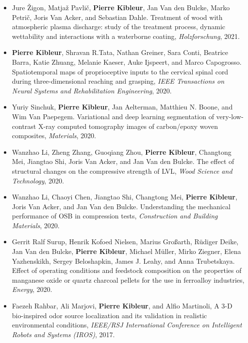 \documentclass[oneside, english, 10pt, a4paper]{memoir}
\begin{document}
\begin{itemize}[leftmargin=*]
		\item {Jure \v{Z}}igon, Matja{\v{z}} Pavli{\v{c}}, \textbf{Pierre Kibleur}, Jan Van den Bulcke, Marko Petri{\v{c}}, Joris Van Acker, and Sebastian Dahle. {Treatment of wood with atmospheric plasma discharge: study of the treatment process, dynamic wettability and interactions with a waterborne coating}, \emph{{Holzforschung}}, 2021.
		
		\item {\textbf{Pierre Kibleur}, Shravan R.Tata, Nathan Greiner, Sara Conti, Beatrice Barra, Katie Zhuang, Melanie Kaeser, Auke Ijspeert, and Marco Capogrosso}. {Spatiotemporal maps of proprioceptive inputs to the cervical spinal cord during three-dimensional reaching and grasping}, \emph{IEEE Transactions on Neural Systems and Rehabilitation Engineering}, 2020.
		
		\item {Yuriy Sinchuk, \textbf{Pierre Kibleur}, Jan Aelterman, Matthieu N. Boone, and Wim Van Paepegem}. {Variational and deep learning segmentation of very-low-contrast X-ray computed tomography images of carbon/epoxy woven composites}, \emph{Materials}, 2020.   
		
		\item {Wanzhao Li, Zheng Zhang, Guoqiang Zhou, \textbf{Pierre Kibleur}, Changtong Mei, Jiangtao Shi, Joris Van Acker, and Jan Van den Bulcke}. {The effect of structural changes on the compressive strength of LVL}, \emph{Wood Science and Technology}, 2020.     
		
		\item  {Wanzhao Li, Chaoyi Chen, Jiangtao Shi, Changtong Mei, \textbf{Pierre Kibleur}, Joris Van Acker, and Jan Van den Bulcke}. {Understanding the mechanical performance of OSB in compression tests}, \emph{Construction and Building Materials}, 2020.
		
		\item {Gerrit Ralf Surup, Henrik Kofoed Nielsen, Marius Gro{\ss}arth, R{\"{u}}diger Deike, Jan Van den Bulcke, \textbf{Pierre Kibleur}, Michael M{\"{u}}ller, Mirko Ziegner, Elena Yazhenskikh, Sergey Beloshapkin, James J. Leahy, and Anna Trubetskaya}. {Effect of operating conditions and feedstock composition on the properties of manganese oxide or quartz charcoal pellets for the use in ferroalloy industries}, \emph{Energy}, 2020.
		
		\item {Faezeh Rahbar, Ali Marjovi, \textbf{Pierre Kibleur}, and Alfio Martinoli, A 3-D bio-inspired odor source localization and its validation in realistic environmental conditions, \emph{IEEE/RSJ International Conference on Intelligent Robots and Systems (IROS)}, 2017.}
	\end{itemize}
\end{document}
